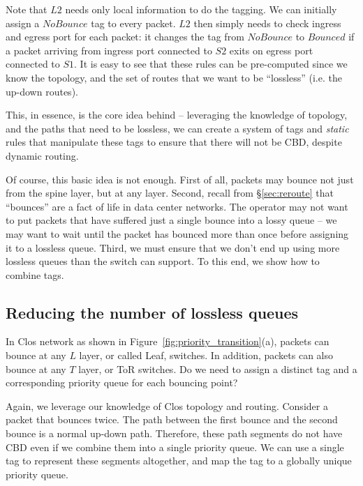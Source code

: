 Note that $L2$ needs only local information to do the tagging. We can initially
assign a $NoBounce$ tag to every packet. $L2$ then simply needs to check ingress
and egress port for each packet: it changes the tag from $NoBounce$ to $Bounced$
if a packet arriving from ingress port connected to $S2$ exits on egress port
connected to $S1$.  It is easy to see that these rules can be pre-computed since
we know the topology, and the set of routes that we want to be ``lossless''
(i.e. the up-down routes). 

This, in essence, is the core idea behind \sysname{} -- leveraging the knowledge of
topology, and the paths that need to be lossless, we can create a system of tags
and {\em static} rules that manipulate these tags to ensure that there will not
be CBD, despite dynamic routing.

Of course, this basic idea is not enough. First of all, packets may bounce not
just from the spine layer, but at any layer. Second, recall from
\S\ref{sec:reroute} that ``bounces'' are a fact of life in data center networks.
The operator may not want to put packets that have suffered just a single bounce
into a lossy queue -- we may want to wait until the packet has bounced more than
once before assigning it to a lossless queue. Third, we must ensure that we
don't end up using more lossless queues than the switch can support. To this
end, we show how to combine tags.

\subsection{Reducing the number of lossless queues}
\label{subsec:combine}

In Clos network as shown in Figure~\ref{fig:priority_transition}(a), packets can
bounce at any $L$ layer, or called Leaf, switches. In addition, packets can also
bounce at any $T$ layer, or ToR switches. Do we need to assign a distinct tag
and a corresponding priority queue for each bouncing point? 

Again, we leverage our knowledge of Clos topology and routing. Consider a packet
that bounces twice. The path between the first bounce and the second bounce is a
normal up-down path. Therefore, these path segments do not have CBD even if we
combine them into a single priority queue. We can use a single tag to represent
these segments altogether, and map the tag to a globally unique priority queue.

